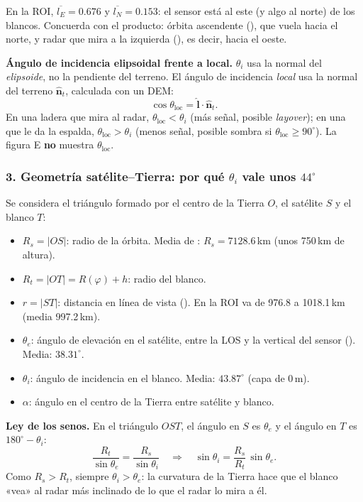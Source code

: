 \documentclass[11pt,a4paper]{article}
\begin{document}
En la ROI, $\overline{l_E} = 0.676$ y $\overline{l_N} = 0.153$: el sensor está al este (y algo al norte) de los blancos. Concuerda con
el producto: órbita ascendente (), que vuela hacia el norte, y radar que mira a la izquierda
(), es decir, hacia el oeste.

\textbf{Ángulo de incidencia elipsoidal frente a local.} $\theta_i$ usa la normal del \emph{elipsoide}, no la pendiente del terreno. El
ángulo de incidencia \emph{local} usa la normal del terreno $\hat{\mathbf n}_t$, calculada con un DEM:
\begin{equation}
  \cos\theta_{\text{loc}} = \hat{\mathbf l}\cdot\hat{\mathbf n}_t .
\end{equation}
En una ladera que mira al radar, $\theta_{\text{loc}} < \theta_i$ (más señal, posible \emph{layover}); en una que le da la espalda,
$\theta_{\text{loc}} > \theta_i$ (menos señal, posible sombra si $\theta_{\text{loc}} \ge 90^\circ$). La figura E \textbf{no} muestra
$\theta_{\text{loc}}$.

\subsubsection*{3. Geometría satélite--Tierra: por qué $\theta_i$ vale unos $44^\circ$}
Se considera el triángulo formado por el centro de la Tierra $O$, el satélite $S$ y el blanco $T$:
\begin{itemize}
  \item $R_s = |OS|$: radio de la órbita. Media de : $R_s = 7128.6$\,km (unos 750\,km de altura).
  \item $R_t = |OT| = R(\varphi) + h$: radio del blanco.
  \item $r = |ST|$: distancia en línea de vista (). En la ROI va de 976.8 a 1018.1\,km (media 997.2\,km).
  \item $\theta_e$: ángulo de elevación en el satélite, entre la LOS y la vertical del sensor (). Media:
        $38.31^\circ$.
  \item $\theta_i$: ángulo de incidencia en el blanco. Media: $43.87^\circ$ (capa de 0\,m).
  \item $\alpha$: ángulo en el centro de la Tierra entre satélite y blanco.
\end{itemize}

\textbf{Ley de los senos.} En el triángulo $OST$, el ángulo en $S$ es $\theta_e$ y el ángulo en $T$ es $180^\circ - \theta_i$:
\begin{equation}
  \frac{R_t}{\sin\theta_e} = \frac{R_s}{\sin\theta_i}
  \quad\Longrightarrow\quad
  \sin\theta_i = \frac{R_s}{R_t}\,\sin\theta_e .
  \label{eq:senos}
\end{equation}
Como $R_s > R_t$, siempre $\theta_i > \theta_e$: la curvatura de la Tierra hace que el blanco «vea» al radar más inclinado de lo que
el radar lo mira a él.
\end{document}
